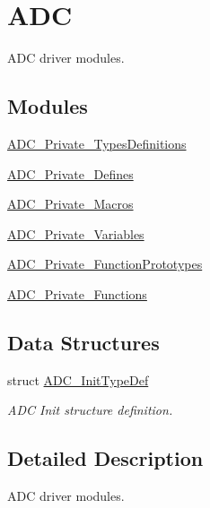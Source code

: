 \hypertarget{group___a_d_c}{\section{A\-D\-C}
\label{group___a_d_c}
}


A\-D\-C driver modules.  


\subsection*{Modules}
\begin{DoxyCompactItemize}
\item 
\hyperlink{group___a_d_c___private___types_definitions}{A\-D\-C\-\_\-\-Private\-\_\-\-Types\-Definitions}
\item 
\hyperlink{group___a_d_c___private___defines}{A\-D\-C\-\_\-\-Private\-\_\-\-Defines}
\item 
\hyperlink{group___a_d_c___private___macros}{A\-D\-C\-\_\-\-Private\-\_\-\-Macros}
\item 
\hyperlink{group___a_d_c___private___variables}{A\-D\-C\-\_\-\-Private\-\_\-\-Variables}
\item 
\hyperlink{group___a_d_c___private___function_prototypes}{A\-D\-C\-\_\-\-Private\-\_\-\-Function\-Prototypes}
\item 
\hyperlink{group___a_d_c___private___functions}{A\-D\-C\-\_\-\-Private\-\_\-\-Functions}
\end{DoxyCompactItemize}
\subsection*{Data Structures}
\begin{DoxyCompactItemize}
\item 
struct \hyperlink{struct_a_d_c___init_type_def}{A\-D\-C\-\_\-\-Init\-Type\-Def}
\begin{DoxyCompactList}\small\item\em A\-D\-C Init structure definition. \end{DoxyCompactList}\end{DoxyCompactItemize}


\subsection{Detailed Description}
A\-D\-C driver modules. 